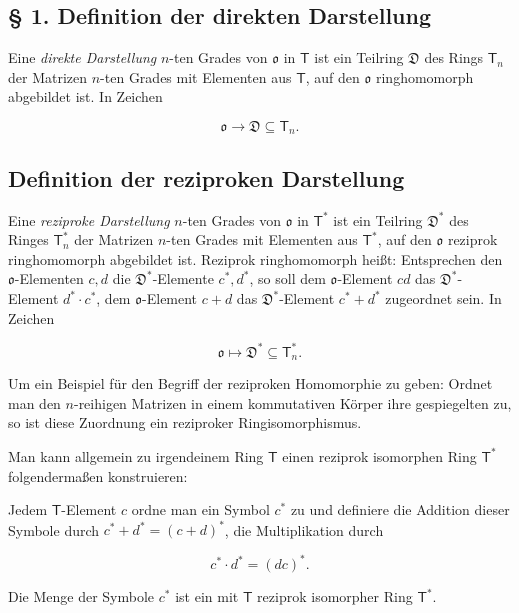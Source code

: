 \subsection*{§ 1. Definition der direkten Darstellung}\label{definition-der-direkten-darstellung}

Eine \emph{direkte Darstellung} \(n\)-ten Grades von \(\mathfrak{o}\) in \(\mathsf T\) ist ein Teilring \(\mathfrak D\) des Rings \(\mathsf T_n\) der Matrizen \(n\)-ten Grades mit Elementen aus \(\mathsf T\), auf den \(\mathfrak{o}\) ringhomomorph abgebildet ist. In Zeichen

\[
\mathfrak{o}\to\mathfrak D\subseteq\mathsf T_n.
\]

\subsection*{Definition der reziproken Darstellung}\label{definition-der-reziproken-darstellung}

Eine \emph{reziproke Darstellung} \(n\)-ten Grades von \(\mathfrak{o}\) in \(\mathsf T^*\) ist ein Teilring \(\mathfrak D^*\) des Ringes \(\mathsf T_n^*\) der Matrizen \(n\)-ten Grades mit Elementen aus \(\mathsf T^*\), auf den \(\mathfrak{o}\) reziprok ringhomomorph abgebildet ist. Reziprok ringhomomorph heißt: Entsprechen den \(\mathfrak{o}\)-Elementen \(c,d\) die \(\mathfrak D^*\)-Elemente \(c^*,d^*\), so soll dem \(\mathfrak{o}\)-Element \(cd\) das \(\mathfrak D^*\)-Element \(d^*\cdot c^*\), dem \(\mathfrak{o}\)-Element \(c+d\) das \(\mathfrak D^*\)-Element \(c^*+d^*\) zugeordnet sein. In Zeichen

\[
\mathfrak{o}\mapsto\mathfrak D^*\subseteq\mathsf T_n^*.
\]

Um ein Beispiel für den Begriff der reziproken Homomorphie zu geben: Ordnet man den \(n\)-reihigen Matrizen in einem kommutativen Körper ihre gespiegelten zu, so ist diese Zuordnung ein reziproker Ringisomorphismus.

Man kann allgemein zu irgendeinem Ring \(\mathsf T\) einen reziprok isomorphen Ring \(\mathsf T^*\) folgendermaßen konstruieren:

Jedem \(\mathsf T\)-Element \(c\) ordne man ein Symbol \(c^*\) zu und definiere die Addition dieser Symbole durch \(c^*+d^*=(c+d)^*\), die Multiplikation durch

\[
c^*\cdot d^*=(dc)^*.
\]

Die Menge der Symbole \(c^*\) ist ein mit \(\mathsf T\) reziprok isomorpher Ring \(\mathsf T^*\).
